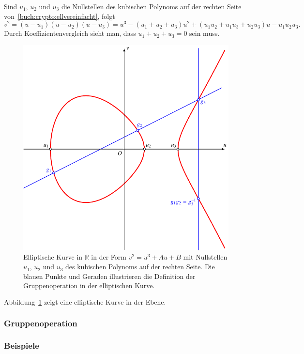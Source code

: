 Sind $u_1$, $u_2$ und $u_3$ die Nullstellen des kubischen Polynoms
auf der rechten Seite von~\eqref{buch:crypto:ellvereinfacht}, folgt
\[
v^2
=
(u-u_1)(u-u_2)(u-u_3)
=
u^3
-(u_1+u_2+u_3)u^2
+(u_1u_2+u_1u_3+u_2u_3)u
-
u_1u_2u_3.
\]
Durch Koeffizientenvergleich sieht man, dass $u_1+u_2+u_3=0$ sein muss.
\begin{figure}
\centering
\includegraphics{chapters/90-crypto/images/elliptic.pdf}
\caption{Elliptische Kurve in $\mathbb{R}$ in der Form
$v^2=u^3+Au+B$ mit Nullstellen $u_1$, $u_2$ und $u_3$ des
kubischen Polynoms auf der rechten Seite.
Die blauen Punkte und Geraden illustrieren die Definition der
Gruppenoperation in der elliptischen Kurve.
\label{buch:crypto:fig:elliptischekurve}}
\end{figure}
Abbildung~\ref{buch:crypto:fig:elliptischekurve}
zeigt eine elliptische Kurve in der Ebene.

\subsubsection{Gruppenoperation}

\subsubsection{Beispiele}

